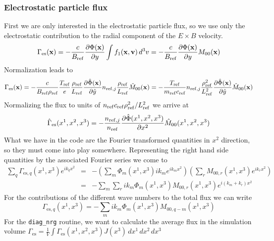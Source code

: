 \subsubsection{Electrostatic particle flux}
First we are only interested in the electrostatic particle flux, so we
use only the electrostatic contribution to the radial component of the
$E\times B$ velocity.
\begin{displaymath}
  \Gamma_\mathrm{es}(\mathbf{x})=-\frac{c}{B_{\mathrm{ref}}}\frac{\partial\Phi(\mathbf{x})}{\partial y} 
  \int f_1(\mathbf{x},\mathbf{v})\,d^3v
  =-\frac{c}{B_{\mathrm{ref}}}\frac{\partial\Phi(\mathbf{x})}{\partial y} M_{00}(\mathbf{x})
\end{displaymath}
Normalization leads to 
\begin{displaymath}
  \Gamma_\mathrm{es}(\mathbf{x})
  =-\frac{c}{B_{\mathrm{ref}}\rho_{\mathrm{ref}}}\frac{T_{\mathrm{ref}}}{e}\frac{\rho_{\mathrm{ref}}}{L_{\mathrm{ref}}}
  \frac{\partial\hat{\Phi}(\mathbf{x})}{\partial \hat{y}} n_{\mathrm{ref},j}\frac{\rho_{\mathrm{ref}}}{L_{\mathrm{ref}}}
   \hat{M}_{00}(\mathbf{x})
  =-\frac{T_{\mathrm{ref}}}{m_{\mathrm{ref}} c_{\mathrm{ref}}}n_{\mathrm{ref},j}\frac{\rho_{\mathrm{ref}}^2}{L_{\mathrm{ref}}^2}
  \frac{\partial\hat{\Phi}(\mathbf{x})}{\partial \hat{y}} \hat{M}_{00}(\mathbf{x})
\end{displaymath}
Normalizing the flux to units of $n_{\mathrm{ref}} c_{\mathrm{ref}} \rho_{\mathrm{ref}}^2/L_{\mathrm{ref}}^2$ we arrive
at
\begin{displaymath}
  \hat{\Gamma}_\mathrm{es}(x^1,x^2,x^3)
  =-\frac{n_{\mathrm{ref},j}}{n_{\mathrm{ref}}}\frac{\partial\hat{\Phi}(x^1,x^2,x^3)}{\partial x^2} \hat{M}_{00}(x^1,x^2,x^3)
\end{displaymath}
What we have in the code are the Fourier transformed quantities in
$x^2$ direction, so they must come into play somewhere. Representing
the right hand side quantities by the associated Fourier series we
come to
\begin{eqnarray*}
\sum_q\Gamma_{\mathrm{es},q}(x^1,x^3)e^{ik_qx^2}
 & = & -\left(\sum_m\Phi_m(x^1,x^3)ik_m e^{ik_mx^2}\right)
   \left(\sum_r M_{00,r}(x^1,x^3)e^{ik_rx^2}\right)\\
 & = & -\sum_m\sum_rik_m\Phi_m(x^1,x^3)M_{00,r}(x^1,x^3) e^{i(k_m+k_r)x^2}
\end{eqnarray*}
For the contributions of the different wave numbers to the total flux
we can write
\begin{displaymath}
  \Gamma_{\mathrm{es},q}(x^1,x^3)
  =-\sum_m ik_m\Phi_m(x^1,x^3)M_{00,q-m}(x^1,x^3)
\end{displaymath}
For the \texttt{diag\_nrg} routine, we want to calculate the average flux
in the simulation volume
$\Gamma_\mathrm{es} = \frac{1}{V} \int \Gamma_\mathrm{es}(x^1,x^2,x^3)J(x^3)\,dx^1\,dx^2\,dx^3$
